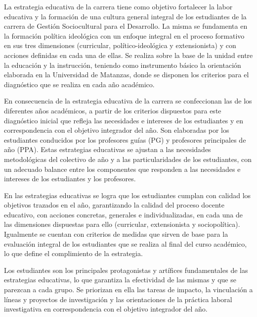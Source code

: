 La estrategia educativa de la carrera tiene como objetivo fortalecer la labor educativa y la formación de una cultura general integral de los estudiantes de la carrera de Gestión Sociocultural para el Desarrollo. La misma se fundamenta en la formación política ideológica con un enfoque integral en el proceso formativo en sus tres dimensiones (curricular, político-ideológica y extensionista) y con acciones definidas en cada una de ellas. Se realiza sobre la base de la unidad entre la educación y la instrucción, teniendo como instrumento básico la orientación elaborada en la Universidad de Matanzas, donde se disponen los criterios para el diagnóstico que se realiza en cada año académico. 

En consecuencia de la estrategia educativa de la carrera se confeccionan las de los diferentes años académicos, a partir de los criterios dispuestos para este diagnóstico inicial que refleja las necesidades e intereses de los estudiantes y en correspondencia con el objetivo integrador del año. Son elaboradas por los estudiantes conducidos por los profesores guías (PG) y profesores principales de año (PPA). Estas estrategias educativas se ajustan a las necesidades metodológicas del colectivo de año y a las particularidades de los estudiantes, con un adecuado balance entre los componentes que responden a las necesidades e intereses de los estudiantes y los profesores. 

En las estrategias educativas se logra que los estudiantes cumplan con calidad los objetivos trazados en el año, garantizando la calidad del proceso docente educativo, con acciones concretas, generales e individualizadas, en cada una de las dimensiones dispuestas para ello (curricular, extensionista y sociopolítica). Igualmente se cuentan con criterios de medidas que sirven de base para la evaluación integral de los estudiantes que se realiza al final del curso académico, lo que define el complimiento de la estrategia.

Los estudiantes son los principales protagonistas y artífices fundamentales de las estrategias educativas, lo que garantiza la efectividad de las mismas y que se parezcan a cada grupo. Se priorizan en ella las tareas de impacto, la vinculación a líneas y proyectos de investigación y las orientaciones de la práctica laboral investigativa en correspondencia con el objetivo integrador del año.